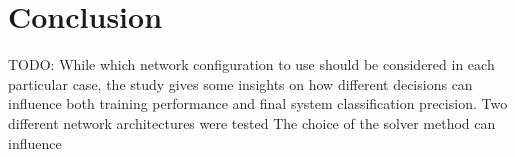 \chapter{Conclusion}
\label{chap:conclusion}


TODO: While which network configuration to use should be considered in each particular case, the study gives some insights on how different decisions can influence both training performance and final system classification precision. Two different network architectures were tested The choice of the solver method can influence 

